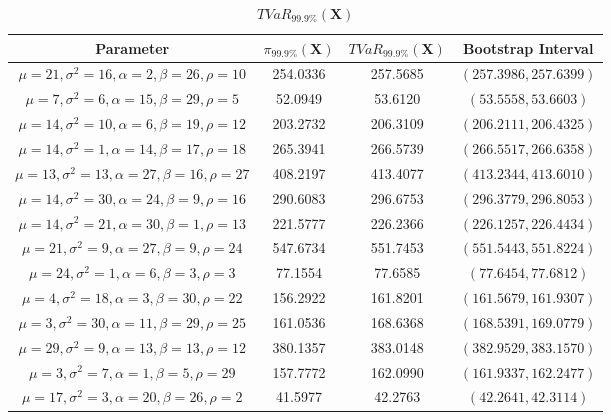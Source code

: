 \documentclass[12pt,travaildirige,nobabel, twoside]{dms}
\numberwithin{equation}{section}
\numberwithin{table}{chapter}
\numberwithin{figure}{chapter}
\begin{document}
\hskip-4.0cm
\begin {table}[h]
\caption {$TVaR_{99.9\%}(\textbf{X})$} \label{tab:result} 
\begin{adjustbox}{width=1.1\textwidth}

\begin{tabular}{|c|c|c|c|}
   \hline
    Parameter & $\pi_{99.9\%}(\textbf{X})$ & $TVaR_{99.9\%}(\textbf{X})$ & Bootstrap Interval \\
   \hline
$\mu=21,\sigma^2=16,\alpha= 2,\beta=26,\rho=10$   & 254.0336  & 257.5685  &   $(257.3986,257.6399) $  \\   
   	\hline
$\mu= 7,\sigma^2= 6,\alpha=15,\beta=29,\rho= 5$   & 52.0949  & 53.6120  &   $(53.5558,53.6603) $  \\   
   	\hline
$\mu=14,\sigma^2=10,\alpha= 6,\beta=19,\rho=12$   & 203.2732  & 206.3109  &   $(206.2111,206.4325) $  \\   
   	\hline
$\mu=14,\sigma^2= 1,\alpha=14,\beta=17,\rho=18$   & 265.3941  & 266.5739  &   $(266.5517,266.6358) $  \\   
   	\hline
$\mu=13,\sigma^2=13,\alpha=27,\beta=16,\rho=27$   & 408.2197  & 413.4077  &   $(413.2344,413.6010) $  \\   
   	\hline
$\mu=14,\sigma^2=30,\alpha=24,\beta= 9,\rho=16$   & 290.6083  & 296.6753  &   $(296.3779,296.8053) $  \\   
   	\hline
$\mu=14,\sigma^2=21,\alpha=30,\beta= 1,\rho=13$   & 221.5777  & 226.2366  &   $(226.1257,226.4434) $  \\   
   	\hline
$\mu=21,\sigma^2= 9,\alpha=27,\beta= 9,\rho=24$   & 547.6734  & 551.7453  &   $(551.5443,551.8224) $  \\   
   	\hline
$\mu=24,\sigma^2= 1,\alpha= 6,\beta= 3,\rho= 3$   & 77.1554  & 77.6585  &   $(77.6454,77.6812) $  \\   
   	\hline
$\mu= 4,\sigma^2=18,\alpha= 3,\beta=30,\rho=22$   & 156.2922  & 161.8201  &   $(161.5679,161.9307) $  \\   
   	\hline
$\mu= 3,\sigma^2=30,\alpha=11,\beta=29,\rho=25$   & 161.0536  & 168.6368  &   $(168.5391,169.0779) $  \\   
   	\hline
$\mu=29,\sigma^2= 9,\alpha=13,\beta=13,\rho=12$   & 380.1357  & 383.0148  &   $(382.9529,383.1570) $  \\   
   	\hline
$\mu= 3,\sigma^2= 7,\alpha= 1,\beta= 5,\rho=29$   & 157.7772  & 162.0990  &   $(161.9337,162.2477) $  \\   
   	\hline
$\mu=17,\sigma^2= 3,\alpha=20,\beta=26,\rho= 2$   & 41.5977  & 42.2763  &   $(42.2641,42.3114) $  \\   

\end{tabular}
\end{adjustbox}
\end{table}
\end{document}
